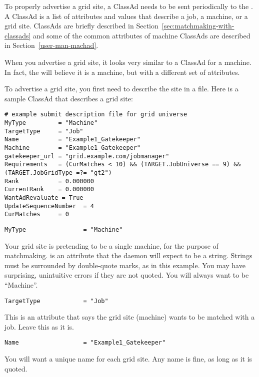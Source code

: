 To properly advertise a grid site, a ClassAd needs to be sent
periodically to the . A ClassAd is a list of
attributes and values that describe a job, a machine, or a grid
site. ClassAds are briefly described in
Section~\ref{sec:matchmaking-with-classads} and some of the common
attributes of machine ClassAds are described in
Section~\ref{user-man-machad}.

When you advertise a grid site, it looks very similar to a ClassAd for
a machine. In fact, the  will believe it is a
machine, but with a different set of attributes. 

To advertise a grid site, you first need to describe the site in a
file. Here is a sample ClassAd that describes a grid site:

\footnotesize
\begin{verbatim}
# example submit description file for grid universe
MyType         = "Machine"
TargetType     = "Job"
Name           = "Example1_Gatekeeper"
Machine        = "Example1_Gatekeeper"
gatekeeper_url = "grid.example.com/jobmanager"
Requirements   = (CurMatches < 10) && (TARGET.JobUniverse == 9) && (TARGET.JobGridType =?= "gt2")
Rank           = 0.000000
CurrentRank    = 0.000000
WantAdRevaluate = True
UpdateSequenceNumber  = 4
CurMatches     = 0
\end{verbatim}
\normalsize


\begin{verbatim}
MyType                = "Machine"
\end{verbatim}

Your grid site is pretending to be a single machine, for the purpose
of matchmaking.  is an attribute that the 
daemon
will expect to be a string. Strings must be surrounded by double-quote
marks, as in this example. You may have surprising, unintuitive errors
if they are not quoted. You will always want  to be
``Machine''. 

\begin{verbatim}
TargetType            = "Job"
\end{verbatim}

This is an attribute that says the grid site (machine) wants to be
matched with a job. Leave this as it is. 


\footnotesize
\begin{verbatim}
Name                  = "Example1_Gatekeeper"
\end{verbatim}
\normalsize

You will want a unique name for each grid site. Any name is fine, as long as
it is quoted.

